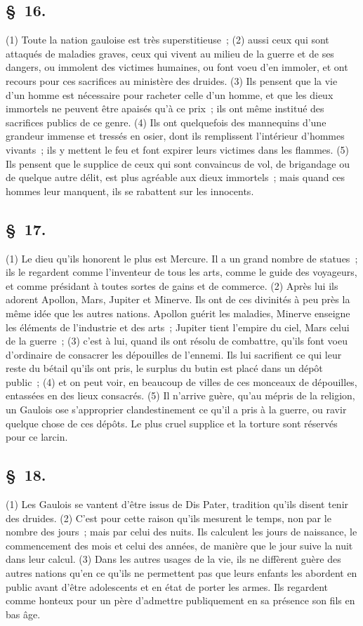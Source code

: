 \documentclass[french,twoside]{book} %
\begin{document}
\subsection[{§ 16.}]{ \textsc{§ 16.} }
\noindent (1) Toute la nation gauloise est très superstitieuse ; (2) aussi ceux qui sont attaqués de maladies graves, ceux qui vivent au milieu de la guerre et de ses dangers, ou immolent des victimes humaines, ou font voeu d’en immoler, et ont recours pour ces sacrifices au ministère des druides. (3) Ils pensent que la vie d’un homme est nécessaire pour racheter celle d’un homme, et que les dieux immortels ne peuvent être apaisés qu’à ce prix ; ils ont même institué des sacrifices publics de ce genre. (4) Ils ont quelquefois des mannequins d’une grandeur immense et tressés en osier, dont ils remplissent l’intérieur d’hommes vivants ; ils y mettent le feu et font expirer leurs victimes dans les flammes. (5) Ils pensent que le supplice de ceux qui sont convaincus de vol, de brigandage ou de quelque autre délit, est plus agréable aux dieux immortels ; mais quand ces hommes leur manquent, ils se rabattent sur les innocents.
\subsection[{§ 17.}]{ \textsc{§ 17.} }
\noindent (1) Le dieu qu’ils honorent le plus est Mercure. Il a un grand nombre de statues ; ils le regardent comme l’inventeur de tous les arts, comme le guide des voyageurs, et comme présidant à toutes sortes de gains et de commerce. (2) Après lui ils adorent Apollon, Mars, Jupiter et Minerve. Ils ont de ces divinités à peu près la même idée que les autres nations. Apollon guérit les maladies, Minerve enseigne les éléments de l’industrie et des arts ; Jupiter tient l’empire du ciel, Mars celui de la guerre ; (3) c’est à lui, quand ils ont résolu de combattre, qu’ils font voeu d’ordinaire de consacrer les dépouilles de l’ennemi. Ils lui sacrifient ce qui leur reste du bétail qu’ils ont pris, le surplus du butin est placé dans un dépôt public ; (4) et on peut voir, en beaucoup de villes de ces monceaux de dépouilles, entassées en des lieux consacrés. (5) Il n’arrive guère, qu’au mépris de la religion, un Gaulois ose s’approprier clandestinement ce qu’il a pris à la guerre, ou ravir quelque chose de ces dépôts. Le plus cruel supplice et la torture sont réservés pour ce larcin.
\subsection[{§ 18.}]{ \textsc{§ 18.} }
\noindent (1) Les Gaulois se vantent d’être issus de Dis Pater, tradition qu’ils disent tenir des druides. (2) C'est pour cette raison qu’ils mesurent le temps, non par le nombre des jours ; mais par celui des nuits. Ils calculent les jours de naissance, le commencement des mois et celui des années, de manière que le jour suive la nuit dans leur calcul. (3) Dans les autres usages de la vie, ils ne diffèrent guère des autres nations qu’en ce qu’ils ne permettent pas que leurs enfants les abordent en public avant d’être adolescents et en état de porter les armes. Ils regardent comme honteux pour un père d’admettre publiquement en sa présence son fils en bas âge.
\end{document}
